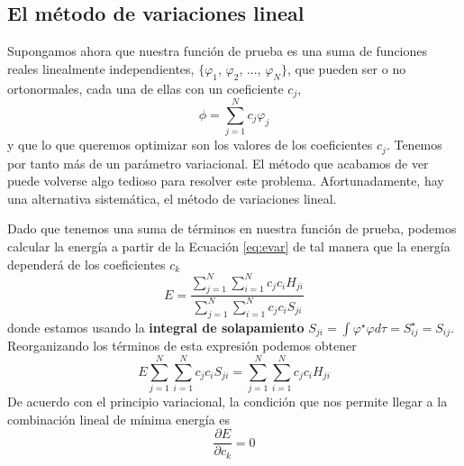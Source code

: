 \subsection{El método de variaciones lineal}
Supongamos ahora que nuestra función de prueba es una
suma de funciones reales linealmente independientes,
$\{\varphi_1$, $\varphi_2$, ..., $\varphi_N\}$, que
pueden ser o no ortonormales, cada una de ellas con
un coeficiente $c_j$,
\begin{equation}
    \phi=\sum_{j=1}^{N}c_j\varphi_j
\end{equation}
y que lo que queremos optimizar son los valores de los 
coeficientes $c_j$. Tenemos por tanto más de un parámetro 
variacional. El método que acabamos de ver puede volverse 
algo tedioso para resolver este problema. Afortunadamente,
hay una alternativa sistemática, el método de variaciones lineal. 
 
Dado que tenemos una suma de términos en nuestra función de
prueba, podemos calcular la energía a partir de la Ecuación
\ref{eq:evar} de tal manera que la energía dependerá de los
coeficientes $c_k$
\begin{equation}
    E=\frac{\sum_{j=1}^N\sum_{i=1}^Nc_jc_iH_{ji}}{\sum_{j=1}^N\sum_{i=1}^N c_j c_iS_{ji}}
\end{equation}
donde estamos usando la \textbf{integral de solapamiento}
$S_{ji}=\int \varphi^\star\varphi d\tau=S^\star_{ij}=S_{ij}$.
Reorganizando los términos de esta expresión podemos obtener 
\begin{equation}
    E\sum_{j=1}^N\sum_{i=1}^N c_j c_iS_{ji}=\sum_{j=1}^N\sum_{i=1}^Nc_jc_iH_{ji}
\end{equation}
De acuerdo con el principio variacional, la condición que nos 
permite llegar a la combinación lineal de mínima energía es
\begin{equation}
    \frac{\partial E}{\partial c_k}=0
    \label{eq:var_deriv}
\end{equation}

